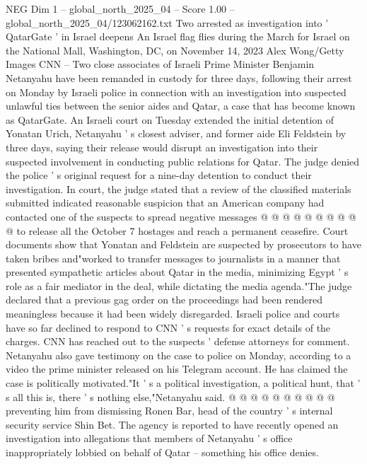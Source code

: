 \begin{textsample}{NEG Dim 1 – global\_north\_2025\_04 – Score 1.00 – global\_north\_2025\_04/123062162.txt}  \label{ex:f1_neg_037}
Two arrested as investigation into ' QatarGate ' in Israel deepens An Israel flag flies during the March for Israel on the National Mall, Washington, DC, on November 14, 2023 Alex Wong/Getty Images CNN -- Two close associates of Israeli Prime Minister Benjamin Netanyahu have been remanded in custody for three days, following their arrest on Monday by Israeli police in connection with an investigation into suspected unlawful ties between the senior aides and Qatar, a case that has become known as QatarGate.
An Israeli court on Tuesday extended the initial detention of Yonatan Urich, Netanyahu ' s closest adviser, and former aide Eli Feldstein by three days, saying their release would disrupt an investigation into their suspected involvement in conducting public relations for Qatar.
The judge denied the police ' s original request for a nine-day detention to conduct their investigation.
In court, the judge stated that a review of the classified materials submitted indicated reasonable suspicion that an American company had contacted one of the suspects to spread negative messages @ @ @ @ @ @ @ @ @ @ to release all the October 7 hostages and reach a permanent ceasefire.
Court documents show that Yonatan and Feldstein are suspected by prosecutors to have taken bribes and"worked to transfer messages to journalists in a manner that presented sympathetic articles about Qatar in the media, minimizing Egypt ' s role as a fair mediator in the deal, while dictating the media agenda."The judge declared that a previous gag order on the proceedings had been rendered meaningless because it had been widely disregarded.
Israeli police and courts have so far declined to respond to CNN ' s requests for exact details of the charges.
CNN has reached out to the suspects ' defense attorneys for comment.
Netanyahu also gave testimony on the case to police on Monday, according to a video the prime minister released on his Telegram account.
He has claimed the case is politically motivated."It ' s a political investigation, a political hunt, that ' s all this is, there ' s nothing else,"Netanyahu said. @ @ @ @ @ @ @ @ @ @ preventing him from dismissing Ronen Bar, head of the country ' s internal security service Shin Bet.
The agency is reported to have recently opened an investigation into allegations that members of Netanyahu ' s office inappropriately lobbied on behalf of Qatar -- something his office denies.

\end{textsample}
